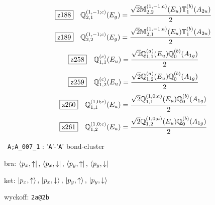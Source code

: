 \documentclass[fleqn,10pt,landscape]{jsarticle}
\begin{document}
\begin{dmath*}
\hspace*{3mm}\fbox{z188}\quad \mathbb{Q}_{2,1}^{(1,-1;c)}(E_{g})=\frac{\sqrt{2} \mathbb{M}_{2,2}^{(1,-1;a)}(E_{u}) \mathbb{T}_{1}^{(b)}(A_{2u})}{2}
\end{dmath*}
\begin{dmath*}
\hspace*{3mm}\fbox{z189}\quad \mathbb{Q}_{2,2}^{(1,-1;c)}(E_{g})=\frac{\sqrt{2} \mathbb{M}_{2,1}^{(1,-1;a)}(E_{u}) \mathbb{T}_{1}^{(b)}(A_{2u})}{2}
\end{dmath*}
\begin{dmath*}
\hspace*{3mm}\fbox{z258}\quad \mathbb{Q}_{1,1}^{(c)}(E_{u})=\frac{\sqrt{2} \mathbb{Q}_{1,1}^{(a)}(E_{u}) \mathbb{Q}_{0}^{(b)}(A_{1g})}{2}
\end{dmath*}
\begin{dmath*}
\hspace*{3mm}\fbox{z259}\quad \mathbb{Q}_{1,2}^{(c)}(E_{u})=\frac{\sqrt{2} \mathbb{Q}_{1,2}^{(a)}(E_{u}) \mathbb{Q}_{0}^{(b)}(A_{1g})}{2}
\end{dmath*}
\begin{dmath*}
\hspace*{3mm}\fbox{z260}\quad \mathbb{Q}_{1,1}^{(1,0;c)}(E_{u})=\frac{\sqrt{2} \mathbb{Q}_{1,1}^{(1,0;a)}(E_{u}) \mathbb{Q}_{0}^{(b)}(A_{1g})}{2}
\end{dmath*}
\begin{dmath*}
\hspace*{3mm}\fbox{z261}\quad \mathbb{Q}_{1,2}^{(1,0;c)}(E_{u})=\frac{\sqrt{2} \mathbb{Q}_{1,2}^{(1,0;a)}(E_{u}) \mathbb{Q}_{0}^{(b)}(A_{1g})}{2}
\end{dmath*}
\vspace{5mm}

\noindent\textbullet\, \texttt{A;A_007_1} : '\texttt{A}'-'\texttt{A}' bond-cluster

\noindent\quad * bra: $\bra{p_{x},\uparrow},\, \bra{p_{x},\downarrow},\, \bra{p_{y},\uparrow},\, \bra{p_{y},\downarrow}$

\noindent\quad * ket: $\ket{p_{x},\uparrow},\, \ket{p_{x},\downarrow},\, \ket{p_{y},\uparrow},\, \ket{p_{y},\downarrow}$

\noindent\quad * wyckoff: \texttt{2a@2b}
\end{document}
